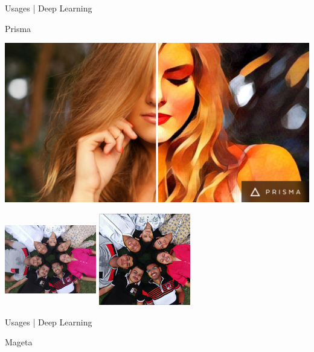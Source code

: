 \documentclass[10pt]{beamer}
\begin{document}
		\begin{frame}{Usages | Deep Learning}
			\begin{center}
				
				
				Prisma
				
				\includegraphics[scale=0.05 ]{images/somnath_13}
				
				\includegraphics[width=40mm,height=40mm ]{images/somnath_14}  \includegraphics[width=40mm,height=40mm  ]{images/somnath_15}
				
				
			\end{center}
		\end{frame}
		\begin{frame}{Usages | Deep Learning}
			\begin{center}
				
				
				Mageta
				
				
				
				
			\end{center}
		\end{frame}
	
\end{document}
